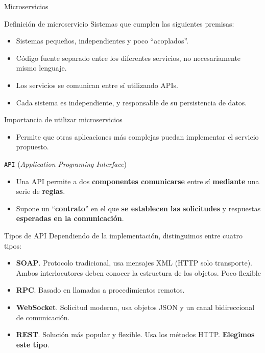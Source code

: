 \documentclass[aspectratio=169,xcolor=dvipsnames]{beamer}
\begin{document}
	\begin{frame}{Microservicios}
		\begin{exampleblock}{Definición de microservicio}
			Sistemas que cumplen las siguientes premisas: 
			
			\begin{itemize}
				\item Sistemas pequeños, independientes y poco ``acoplados''. 
				\item Código fuente separado entre los diferentes servicios, no necesariamente mismo lenguaje.
				\item Los servicios se comunican entre sí utilizando APIs.
				\item Cada sistema es independiente, y responsable de su persistencia de datos.
			\end{itemize}
		\end{exampleblock}
		
		\begin{alertblock}{Importancia de utilizar microservicios}
			\begin{itemize}
				\item Permite que otras aplicaciones más complejas puedan implementar el servicio propuesto.
			\end{itemize}
		\end{alertblock}
	\end{frame}

	
	\begin{frame}{\texttt{API} \small (\textit{Application Programing Interface})}
		\begin{itemize}
			\item Una API permite a dos \textbf{componentes comunicarse} entre sí \textbf{mediante} una serie de \textbf{reglas}.
			
			\item Supone un ``\textbf{contrato}'' en el que \textbf{se establecen las solicitudes} y respuestas \textbf{esperadas en la comunicación}.
		\end{itemize}
	
		\begin{exampleblock}{Tipos de API}
			Dependiendo de la implementación, distinguimos entre cuatro tipos:
			
			\begin{itemize}
				\item \textbf{SOAP}. Protocolo tradicional, usa mensajes XML (HTTP solo transporte). Ambos interlocutores deben conocer la estructura de los objetos. Poco flexible
				\item \textbf{RPC}. Basado en llamadas a procedimientos remotos. 
				\item \textbf{WebSocket}. Solicitud moderna, usa objetos JSON y un canal bidireccional de comunicación.
				\item \textbf{REST}. Solución más popular y flexible. Usa los métodos HTTP. \textbf{Elegimos este tipo}.
			\end{itemize}
		\end{exampleblock}
	\end{frame}
	
\end{document}
